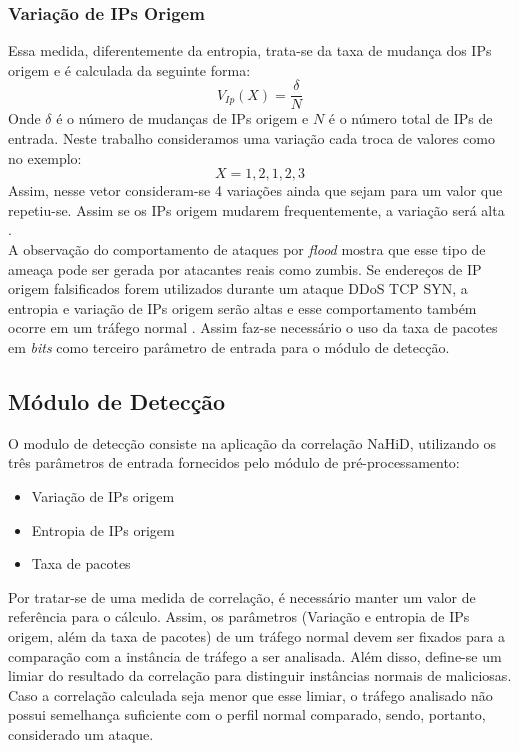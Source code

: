 \subsubsection{Variação de IPs Origem}
Essa medida, diferentemente da entropia, trata-se da taxa de mudança dos IPs origem e é calculada da seguinte forma:
\begin{equation}
	V_{Ip}(X) = \frac{\delta}{N}
\end{equation}
Onde $\delta$ é o número de mudanças de IPs origem e $N$ é o número total de IPs de entrada. Neste trabalho consideramos uma variação cada troca de valores como no exemplo:
\begin{equation}
	X = {1,2,1,2,3}
\end{equation}
Assim, nesse vetor consideram-se 4 variações ainda que sejam para um valor que repetiu-se. Assim se os IPs origem mudarem frequentemente, a variação será alta \cite{HOQUE201748}.
\\
A observação do comportamento de ataques por \textit{flood} mostra que esse tipo de ameaça pode ser gerada por atacantes reais como zumbis. Se endereços de IP origem falsificados forem utilizados durante um ataque DDoS TCP SYN, a entropia e variação de IPs origem serão altas e esse comportamento também ocorre em um tráfego normal \cite{HOQUE201748}. Assim faz-se necessário o uso da taxa de pacotes em \textit{bits} como terceiro parâmetro de entrada para o módulo de detecção.

\subsection{Módulo de Detecção}
O modulo de detecção consiste na aplicação da correlação NaHiD, utilizando os três parâmetros de entrada fornecidos pelo módulo de pré-processamento:
\begin{itemize}
	\item Variação de IPs origem
	\item Entropia de IPs origem
	\item Taxa de pacotes
\end{itemize}

Por tratar-se de uma medida de correlação, é necessário manter um valor de referência para o cálculo. Assim, os parâmetros (Variação e entropia de IPs origem, além da taxa de pacotes) de um tráfego normal devem ser fixados para a comparação com a instância de tráfego a ser analisada. Além disso, define-se um limiar do resultado da correlação para distinguir instâncias normais de maliciosas. Caso a correlação calculada seja menor que esse limiar, o tráfego analisado não possui semelhança suficiente com o perfil normal comparado, sendo, portanto, considerado um ataque.
